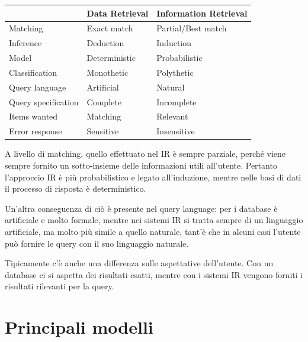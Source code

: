 \begin{table}[htbp]
	\centering
	\begin{tabular}{l|l|l|}
		\cline{2-3}
		& Data Retrieval & Information Retrieval            \\ \hline
		\multicolumn{1}{|l|}{Matching}            & Exact match    & Partial/Best match\\ \hline
		\multicolumn{1}{|l|}{Inference}           & Deduction      & Induction                        \\ \hline
		\multicolumn{1}{|l|}{Model}               & Deterministic  & Probabilistic                    \\ \hline
		\multicolumn{1}{|l|}{Classification}      & Monothetic     & Polythetic                       \\ \hline
		\multicolumn{1}{|l|}{Query language}      & Artificial     & Natural                          \\ \hline
		\multicolumn{1}{|l|}{Query specification} & Complete       & Incomplete                       \\ \hline
		\multicolumn{1}{|l|}{Items wanted}        & Matching       & Relevant                         \\ \hline
		\multicolumn{1}{|l|}{Error response}      & Sensitive      & Insensitive                      \\ \hline
	\end{tabular}
\end{table}

A livello di matching, quello effettuato nel IR è sempre parziale, perché viene sempre fornito un sotto-insieme delle informazioni utili all'utente.
Pertanto l'approccio IR è più probabilistico e legato all'induzione, mentre nelle basi di dati il processo di risposta è deterministico.

Un'altra conseguenza di ciò è presente nel query language: per i database è artificiale e molto formale, mentre nei sistemi IR si tratta sempre di un linguaggio artificiale, ma molto più simile a quello naturale, tant'è che in alcuni casi l'utente può fornire le query con il suo linguaggio naturale.

Tipicamente c'è anche una differenza sulle aspettative dell'utente.
Con un database ci si aspetta dei risultati esatti, mentre con i sistemi IR vengono forniti i risultati rilevanti per la query.

\section{Principali modelli}

